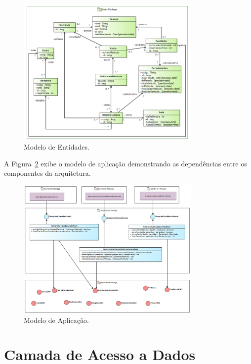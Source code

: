 \begin{figure}[h]
	\centering
	\includegraphics[width=0.8\textwidth]{figuras/modelo-entidades-10.png}
	\caption{Modelo de Entidades.}
	\label{modelo-entidades-10}
\end{figure}

A Figura~\ref{modelo-aplicacao-10} exibe o modelo de aplicação demonstrando as dependências entre os componentes da arquitetura.

\begin{figure}[h]
	\centering
	\includegraphics[width=0.8\textwidth]{figuras/modelo-aplicacao-10.png}
	\caption{Modelo de Aplicação.}
	\label{modelo-aplicacao-10}
\end{figure}

\section{Camada de Acesso a Dados}
\label{sec-arquitetura-dados}

